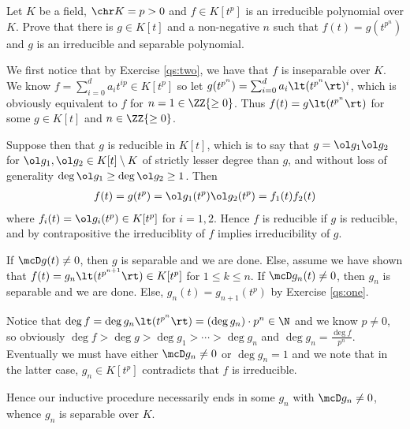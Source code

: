\documentclass{article}
\begin{document}
\begin{exercise} %
Let \( K \) be a field, \( \chr K = p > 0 \) and \( f\in K[t^p] \) is an irreducible polynomial over \( K \).
Prove that there is \( g\in K[t] \) and a non-negative \( n \) such that \( f(t)=g\left(t^{p^n}\right) \) and \( g \) is an irreducible and separable polynomial.
\end{exercise}
\begin{solution}
We first notice that by Exercise \ref{qs:two}, we have that \( f \) is inseparable over \( K \).
We know \( f = \sum_{i=0}^{d} a_i t^{ip} \in K[t^p] \) so let \( g(t^{p^n}) = \sum_{i=0}^{d} a_i \lt(t^{p^n}\rt)^i \), which is obviously equivalent to \( f \) for \( n=1 \in \ZZ{\ge 0} \).
Thus \( f(t) = g\lt(t^{p^n}\rt) \) for some \( g\in K[t] \) and \( n\in \ZZ{\ge 0} \).

Suppose then that \( g \) is reducible in \( K[t] \), which is to say that \( g=\ol g_1\ol g_2 \) for \( \ol g_1,\ol g_2\in K[t]\setminus K \) of strictly lesser degree than \( g \), and without loss of generality \( \deg \ol g_1\geq \deg \ol g_2 \geq 1 \).
Then \begin{align*}
  f(t) = g(t^p) = \ol g_1(t^p)\ol g_2(t^p) = f_1(t)f_2(t)
\end{align*}
where \( f_i(t) = \ol g_i(t^p)\in K[t^p] \) for \( i = 1,2 \).
Hence \( f \) is reducible if \( g \) is reducible, and by contrapositive the irreduciblity of \( f \) implies irreducibility of \( g \).

If \( \mcD g(t) \neq 0 \), then \( g \) is separable and we are done.
Else, assume we have shown that \( f(t) = g_n\lt(t^{p^{n+1}}\rt) \in K[t^p] \) for \( 1\le k \le n \).
If \( \mcD g_n(t) \neq 0 \), then \( g_n \) is separable and we are done.
Else, \( g_n(t) = g_{n+1}(t^p) \) by Exercise \ref{qs:one}.

Notice that \( \deg f=\deg g_n\lt(t^{p^n}\rt) = (\deg g_n)\cdot p^n \in \N \) and we know \( p\neq 0 \), so obviously \( \deg f > \deg g > \deg g_1 > \cdots > \deg g_n \) and \( \deg g_n = \frac{\deg f}{p^n} \).
Eventually we must have either \( \mcD g_n \neq 0 \) or \( \deg g_n = 1 \) and we note that in the latter case, \( g_n\in K[t^p] \) contradicts that \( f \) is irreducible.

Hence our inductive procedure necessarily ends in some \( g_n \) with \( \mcD g_n \neq 0 \), whence \( g_n \) is separable over \( K \).
\end{solution}
\end{document}
